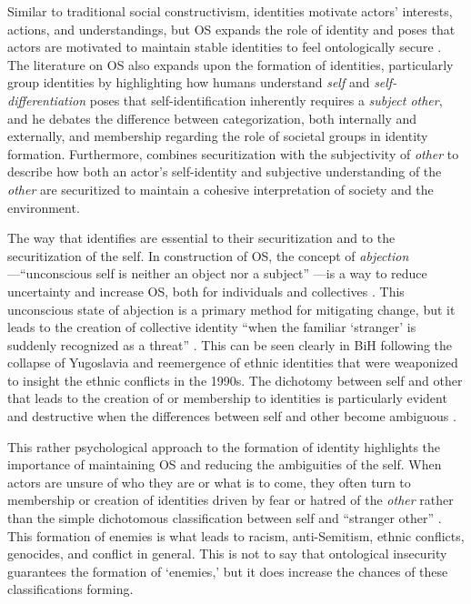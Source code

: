 Similar to traditional social constructivism, identities motivate actors' interests, actions, and understandings, but \ac{OS} expands the role of identity and poses that actors are motivated to maintain stable identities to feel ontologically secure \citep[pg.~344-345]{mitzenOntologicalSecurityWorld2006}. The literature on \ac{OS} also expands upon the formation of identities, particularly group identities by highlighting how humans understand \textit{self} and \textit{self-differentiation} \citep[pg.~749-750]{kinnvall2004} \citet[pg.~749-752]{kinnvall2004} poses that self-identification inherently requires a \textit{subject other}, and he debates the difference between categorization, both internally and externally, and membership regarding the role of societal groups in identity formation. Furthermore, \citet[pg.~751-752]{kinnvall2004} combines securitization with the subjectivity of \textit{other} to describe how both an actor's self-identity and subjective understanding of the \textit{other} are securitized to maintain a cohesive interpretation of society and the environment.

The way that identifies are essential to their securitization and to the securitization of the self. In  construction of \ac{OS}, the concept of \textit{abjection}---``unconscious self is neither an object nor a subject'' \citep[pg.~753]{kinnvall2004}---is a way to reduce uncertainty and increase \ac{OS}, both for individuals and collectives \citep[pg.~753-754]{kinnvall2004}. This unconscious state of abjection is a primary method for mitigating change, but it leads to the creation of collective identity ``when the familiar `stranger' is suddenly recognized as a threat'' \citep[pg.~753]{kinnvall2004}. This can be seen clearly in \ac{BiH} following the collapse of Yugoslavia and reemergence of ethnic identities that were weaponized to insight the ethnic conflicts in the 1990s. The dichotomy between self and other that leads to the creation of or membership to identities is particularly evident and destructive when the differences between self and other become ambiguous \citep[as cited in \citealt{kinnvall2004}, pg.~753]{norton1988}. 

This rather psychological approach to the formation of identity highlights the importance of maintaining \ac{OS} and reducing the ambiguities of the self. When actors are unsure of who they are or what is to come, they often turn to membership or creation of identities driven by fear or hatred of the \textit{other} rather than the simple dichotomous classification between self and ``stranger other'' \citep[pg.754~755]{kinnvall2004}. This formation of enemies is what leads to racism, anti-Semitism, ethnic conflicts, genocides, and conflict in general. This is not to say that ontological insecurity guarantees the formation of `enemies,' but it does increase the chances of these classifications forming.


